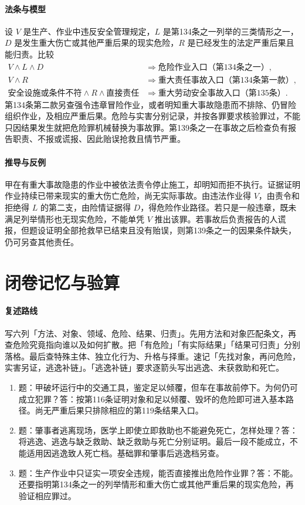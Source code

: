 \paragraph{法条与模型}
设 $V$ 是生产、作业中违反安全管理规定，$L$ 是第134条之一列举的三类情形之一，$D$ 是发生重大伤亡或其他严重后果的现实危险，$R$ 是已经发生的法定严重后果且能归责。比较
\[
\begin{aligned}
 V\land L\land D&\Longrightarrow \text{危险作业入口（第134条之一）},\\
 V\land R&\Longrightarrow \text{重大责任事故入口（第134条第一款）},\\
 \text{安全设施或条件不符}\land R\land\text{直接责任}
   &\Longrightarrow \text{重大劳动安全事故入口（第135条）}.
\end{aligned}
\]
第134条第二款另查强令违章冒险作业，或者明知重大事故隐患而不排除、仍冒险组织作业，及相应严重后果。危险与实害分别记录，并按各罪要求核验罪过，不能只因结果发生就把危险罪机械替换为事故罪。第139条之一在事故之后检查负有报告职责、不报或谎报、因此贻误抢救且情节严重。

\paragraph{推导与反例}
甲在有重大事故隐患的作业中被依法责令停止施工，却明知而拒不执行。证据证明作业持续已带来现实的重大伤亡危险，尚无实际事故。由违法作业得 $V$，由责令和拒绝得 $L$ 的第二支，由险情证据得 $D$，得危险作业路径。若只是一般违章，既未满足列举情形也无现实危险，不能单凭 $V$ 推出该罪。若事故后负责报告的人谎报，但题设证明全部抢救早已结束且没有贻误，则第139条之一的因果条件缺失，仍可另查其他责任。

\section*{闭卷记忆与验算}
\paragraph{复述路线}
写六列「方法、对象、领域、危险、结果、归责」。先用方法和对象匹配条文，再查危险究竟指向谁以及如何扩散。把「有危险」「有实际结果」「结果可归责」分别落格。最后查特殊主体、独立化行为、升格与择重。速记「先找对象，再问危险，实害另证，逃逸补链」。「逃逸补链」要求逐箭头写出逃逸、未获救助和死亡。

\begin{enumerate}
\item 题：甲破坏运行中的交通工具，鉴定足以倾覆，但车在事故前停下。为何仍可成立犯罪？答：按第116条证明对象和足以倾覆、毁坏的危险即可进入基本路径。尚无严重后果只排除相应的第119条结果入口。
\item 题：肇事者逃离现场，医学上即使立即救助也不能避免死亡，怎样处理？答：将逃逸、逃逸与缺乏救助、缺乏救助与死亡分别证明。最后一段不能成立，不能适用因逃逸致人死亡档。基础罪和肇事后逃逸档另查。
\item 题：生产作业中只证实一项安全违规，能否直接推出危险作业罪？答：不能。还要指明第134条之一的列举情形和重大伤亡或其他严重后果的现实危险，再验证相应罪过。
\end{enumerate}
